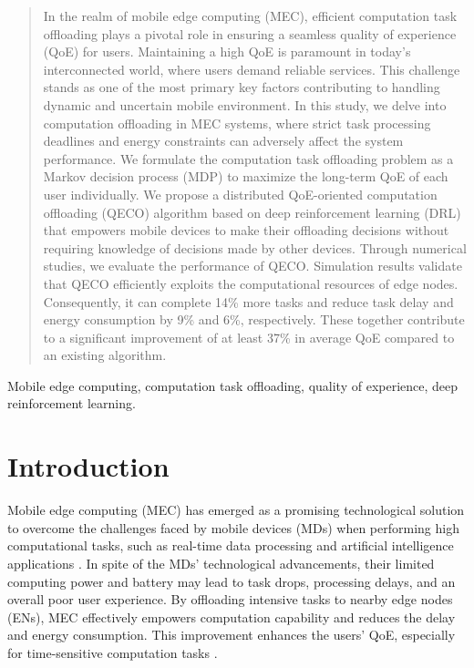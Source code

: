 \documentclass[12pt,draftclsnofoot,onecolumn]{IEEEtran}
\begin{document}


\begin{abstract}
	In the realm of mobile edge computing (MEC), efficient computation task offloading plays a pivotal role in ensuring a seamless quality of experience (QoE) for users. Maintaining a high QoE is paramount in today's interconnected world, where users demand reliable services. This challenge stands as one of the most primary key factors contributing to handling dynamic and uncertain mobile environment. In this study, we delve into computation offloading in MEC systems, where strict task processing deadlines and energy constraints can adversely affect the system performance. We formulate the computation task offloading problem as a Markov decision process (MDP) to maximize the long-term QoE of each user individually. We propose a distributed QoE-oriented computation offloading (QECO) algorithm based on deep reinforcement learning (DRL) that empowers mobile devices to make their offloading decisions without requiring knowledge of decisions made by other devices. Through numerical studies, we evaluate the performance of QECO. Simulation results validate that QECO efficiently exploits the computational resources of edge nodes. Consequently, it can complete 14\% more tasks and reduce task delay and energy consumption by 9\% and 6\%, respectively. These together contribute to a significant improvement of at least 37\% in average QoE compared to an existing algorithm.
\end{abstract}

\begin{IEEEkeywords}
	Mobile edge computing, computation task offloading, quality of experience, deep reinforcement learning.
\end{IEEEkeywords}

\section{Introduction} 


Mobile edge computing (MEC) \cite{mao2017survey} has emerged as a promising technological solution to overcome the challenges faced by mobile devices (MDs) when performing high computational tasks, such as real-time data processing and artificial intelligence applications \cite{zhou2019edge} \cite{yousefpour2019all}. In spite of the MDs' technological advancements, their limited computing power and battery may lead to task drops, processing delays, and an overall poor user experience. By offloading intensive tasks to nearby edge nodes (ENs), MEC effectively empowers computation capability and reduces the delay and energy consumption. This improvement enhances the users' QoE, especially for time-sensitive computation tasks \cite{TNSE-QOE-24} \cite{ shah2018hierarchical}. 
\end{document}
